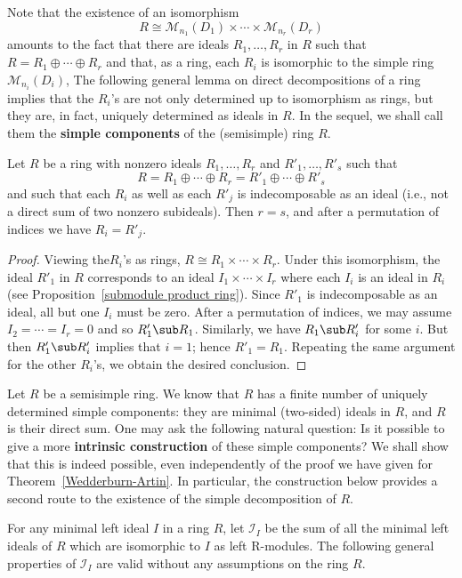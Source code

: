 Note that the existence of an isomorphism
\[R\cong\mathcal{M}_{n_1}(D_1)\times\cdots\times\mathcal{M}_{n_r}(D_r)\]
amounts to the fact that there are ideals $R_1,\dots,R_r$ in $R$ such that $R=R_1\oplus\cdots\oplus R_r$ and that, as a ring, each $R_i$ is isomorphic to the simple ring $\mathcal{M}_{n_i}(D_i)$, The following general lemma on direct decompositions of a ring implies that the $R_i$'s are not only determined up to isomorphism as rings, but they are, in fact, uniquely determined as ideals in $R$. In the sequel, we shall call them the \textbf{simple components} of the (semisimple) ring $R$.
\begin{lemma}
Let $R$ be a ring with nonzero ideals $R_1,\dots,R_r$ and $R'_1,\dots,R'_s$ such that
\[R=R_1\oplus\cdots\oplus R_r=R'_1\oplus\cdots\oplus R'_s\]
and such that each $R_i$ as well as each $R'_j$ is indecomposable as an ideal (i.e., not a direct sum of two nonzero subideals). Then $r=s$, and after a permutation of indices we have $R_i=R'_j$.
\end{lemma}
\begin{proof}
Viewing the$R_i$'s as rings, $R\cong R_1\times\cdots\times R_r$. Under this isomorphism, the ideal $R'_1$ in $R$ corresponds to an ideal $I_1\times\cdots\times I_r$ where each $I_i$ is an ideal in $R_i$ (see Proposition~\ref{submodule product ring}). Since $R'_1$ is indecomposable as an ideal, all but one $I_i$ must be zero. After a permutation of indices, we may assume $I_2=\cdots=I_r=0$ and so $R'_1\sub R_1$. Similarly, we have $R_1\sub R'_i$ for some $i$. But then $R'_1\sub R'_i$ implies that $i=1$; hence $R'_1=R_1$. Repeating the same argument for the other $R_i$'s, we obtain the desired conclusion.
\end{proof}
Let $R$ be a semisimple ring. We know that $R$ has a finite number of uniquely determined simple components: they are minimal (two-sided) ideals in $R$, and $R$ is their direct sum. One may ask the following natural question: Is it possible to give a more \textbf{intrinsic construction} of these simple components? We shall show that this is indeed possible, even independently of the proof we have given for Theorem~\ref{Wedderburn-Artin}. In particular, the construction below provides a second route to the existence of the simple decomposition of $R$.\par
For any minimal left ideal $I$ in a ring $R$, let $\mathscr{I}_I$ be the sum of all the minimal left ideals of $R$ which are isomorphic to $I$ as left R-modules. The following general properties of $\mathscr{I}_I$ are valid without any assumptions on the ring $R$.
